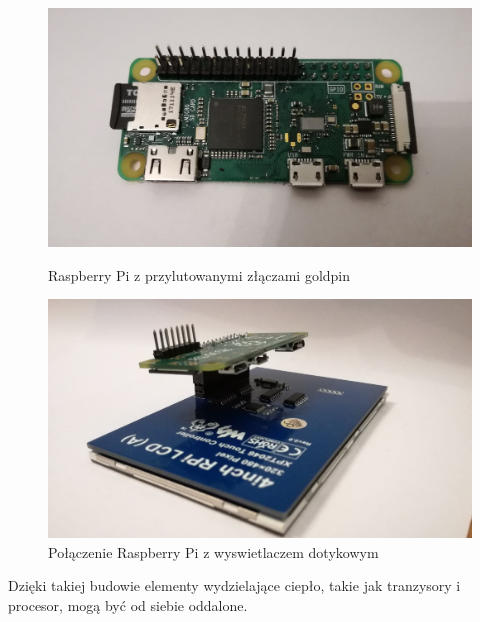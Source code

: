 \documentclass[12pt, eng, twoside, openany, final]{mgr}
\begin{document}
       
        \begin{figure}[!h]
        	\centering
        	\begin{minipage}[t]{5cm}
        		\centering
        		\includegraphics[scale=0.1]{rpi_goldpin.jpg}
        		\caption{Raspberry Pi z przylutowanymi złączami goldpin} \label{fig:rpi1} 
        	\end{minipage}
        	\hspace{3cm}
        	\begin{minipage}[t]{5cm}
        		\centering
        		\includegraphics[scale=0.1]{rpi_lcd.jpg}
        		\caption{Połączenie Raspberry Pi z wyswietlaczem dotykowym} \label{fig:rpi_lcd} 
        	\end{minipage}
        \end{figure}
        Dzięki takiej budowie elementy wydzielające ciepło, takie jak tranzysory i procesor, mogą być od siebie oddalone. 
\end{document}
